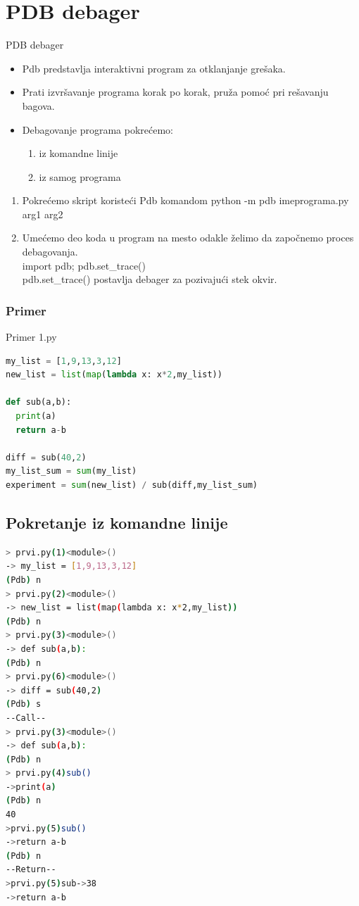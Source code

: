 \documentclass{beamer}
\begin{document}
\section{PDB debager}
 \begin{frame}{PDB debager}
\begin{itemize}
\item Pdb predstavlja interaktivni program za otklanjanje grešaka.
\item Prati izvršavanje programa korak po korak, pruža pomoć pri rešavanju bagova.
\item Debagovanje programa pokrećemo:
\begin{enumerate}
\item iz komandne linije
\item iz samog programa
\end{enumerate}
\end{itemize}
\begin{enumerate}
\item Pokrećemo skript koristeći Pdb komandom {\color{blue}python -m pdb imeprograma.py arg1 arg2}
\item Umećemo deo koda u program na mesto odakle želimo da započnemo proces debagovanja.
\\ {\color{blue}import pdb; pdb.set\_trace()}
\\ {\color{blue}pdb.set\_trace()} postavlja debager za pozivajući stek okvir.
\end{enumerate}
\end{frame}
\begin{frame}[fragile] %
\frametitle{Primer}
\begin{exampleblock}{Primer 1.py}
  \begin{lstlisting}[language = python]
my_list = [1,9,13,3,12]
new_list = list(map(lambda x: x*2,my_list))

def sub(a,b):
  print(a)
  return a-b
  
diff = sub(40,2)
my_list_sum = sum(my_list)
experiment = sum(new_list) / sub(diff,my_list_sum)
   \end{lstlisting}
   \end{exampleblock}

\end{frame}
\subsection{Pokretanje iz komandne linije}
\begin{frame}[fragile]
\begin{lstlisting}[language = bash]
> prvi.py(1)<module>()
-> my_list = [1,9,13,3,12]
(Pdb) n
> prvi.py(2)<module>()
-> new_list = list(map(lambda x: x*2,my_list))
(Pdb) n
> prvi.py(3)<module>()
-> def sub(a,b):
(Pdb) n
> prvi.py(6)<module>()
-> diff = sub(40,2)
(Pdb) s
--Call--
> prvi.py(3)<module>()
-> def sub(a,b):
(Pdb) n
> prvi.py(4)sub()
->print(a)
(Pdb) n
40
>prvi.py(5)sub()
->return a-b
(Pdb) n
--Return--
>prvi.py(5)sub->38
->return a-b
\end{lstlisting}
\end{frame}
\end{document}
